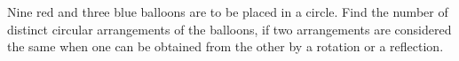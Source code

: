 Nine red and three blue balloons are to be placed in a circle. Find the number of distinct circular arrangements of the balloons, if two arrangements are considered the same when one can be obtained from the other by a rotation or a reflection.
